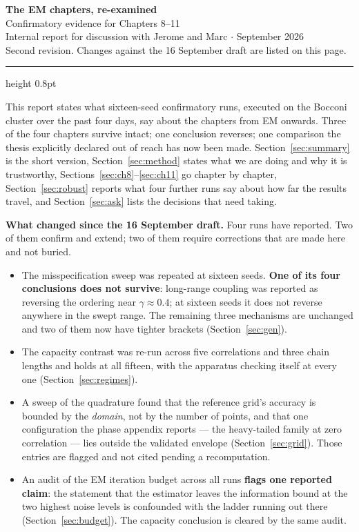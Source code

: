 \documentclass[11pt,a4paper]{article}
\begin{document}
\begin{center}
{\LARGE\bfseries The EM chapters, re-examined}\\[0.45em]
{\large Confirmatory evidence for Chapters 8--11}\\[0.9em]
{\small Internal report for discussion with Jerome and Marc \quad$\cdot$ September 2026}\\[0.25em]
{\footnotesize Second revision. Changes against the 16 September draft are listed on this page.}
\end{center}

\vspace{0.4em}
\hrule height 0.8pt
\vspace{1.2em}

\noindent
This report states what sixteen-seed confirmatory runs, executed on the Bocconi cluster over the
past four days, say about the chapters from EM onwards. Three of the four chapters survive intact;
one conclusion reverses; one comparison the thesis explicitly declared out of reach has now been
made. Section~\ref{sec:summary} is the short version, Section~\ref{sec:method} states what we are
doing and why it is trustworthy, Sections~\ref{sec:ch8}--\ref{sec:ch11} go chapter by chapter,
Section~\ref{sec:robust} reports what four further runs say about how far the results travel, and
Section~\ref{sec:ask} lists the decisions that need taking.

\medskip
\noindent
\textbf{What changed since the 16 September draft.} Four runs have reported. Two of them confirm
and extend; two of them require corrections that are made here and not buried.
\begin{itemize}[topsep=0.25em]
\item The misspecification sweep was repeated at sixteen seeds. \textbf{One of its four
conclusions does not survive}: long-range coupling was reported as reversing the ordering near
$\gamma\approx0.4$; at sixteen seeds it does not reverse anywhere in the swept range. The
remaining three mechanisms are unchanged and two of them now have tighter brackets
(Section~\ref{sec:gen}).
\item The capacity contrast was re-run across five correlations and three chain lengths and holds
at all fifteen, with the apparatus checking itself at every one (Section~\ref{sec:regimes}).
\item A sweep of the quadrature found that the reference grid's accuracy is bounded by the
\emph{domain}, not by the number of points, and that one configuration the phase appendix reports
--- the heavy-tailed family at zero correlation --- lies outside the validated envelope
(Section~\ref{sec:grid}). Those entries are flagged and not cited pending a recomputation.
\item An audit of the EM iteration budget across all runs \textbf{flags one reported claim}: the
statement that the estimator leaves the information bound at the two highest noise levels is
confounded with the ladder running out there (Section~\ref{sec:budget}). The capacity conclusion
is cleared by the same audit.
\end{itemize}
\end{document}
